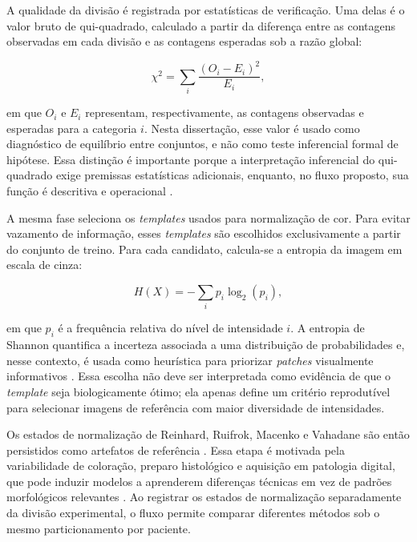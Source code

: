 A qualidade da divisão é registrada por estatísticas de verificação. Uma delas é
o valor bruto de qui-quadrado, calculado a partir da diferença entre as contagens
observadas em cada divisão e as contagens esperadas sob a razão global:

\begin{equation}
    \chi^2 =
    \sum_i \frac{(O_i-E_i)^2}{E_i},
    \label{eq:qui_quadrado}
\end{equation}

em que $O_i$ e $E_i$ representam, respectivamente, as contagens observadas e
esperadas para a categoria $i$. Nesta dissertação, esse valor é usado como
diagnóstico de equilíbrio entre conjuntos, e não como teste inferencial formal
de hipótese. Essa distinção é importante porque a interpretação inferencial do
qui-quadrado exige premissas estatísticas adicionais, enquanto, no fluxo
proposto, sua função é descritiva e operacional \cite{pearson1900criterion}.

A mesma fase seleciona os \textit{templates} usados para normalização de cor.
Para evitar vazamento de informação, esses \textit{templates} são escolhidos
exclusivamente a partir do conjunto de treino. Para cada candidato, calcula-se a
entropia da imagem em escala de cinza:

\begin{equation}
    H(X)=-\sum_i p_i\log_2(p_i),
    \label{eq:entropia}
\end{equation}

em que $p_i$ é a frequência relativa do nível de intensidade $i$. A entropia de
Shannon quantifica a incerteza associada a uma distribuição de probabilidades e,
nesse contexto, é usada como heurística para priorizar \textit{patches}
visualmente informativos \cite{shannon1948mathematical}. Essa escolha não deve
ser interpretada como evidência de que o \textit{template} seja biologicamente
ótimo; ela apenas define um critério reprodutível para selecionar imagens de
referência com maior diversidade de intensidades.

Os estados de normalização de Reinhard, Ruifrok, Macenko e Vahadane são então
persistidos como artefatos de referência
\cite{reinhard2001color,ruifrok2001quantification,macenko2009method,vahadane2016structure}.
Essa etapa é motivada pela variabilidade de coloração, preparo histológico e
aquisição em patologia digital, que pode induzir modelos a aprenderem diferenças
técnicas em vez de padrões morfológicos relevantes
\cite{tellez2019augmentation,duenweg2023scanner}. Ao registrar os estados de
normalização separadamente da divisão experimental, o fluxo permite comparar
diferentes métodos sob o mesmo particionamento por paciente.

